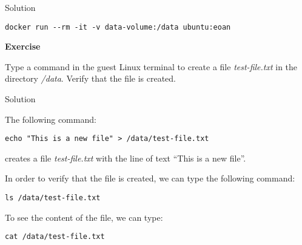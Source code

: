 \documentclass[
]{article}
\newenvironment{infobox}[1]
  {
  \begin{itemize}
  \renewcommand{\labelitemi}{
    \raisebox{-.7\height}[0pt][0pt]{
      
    }
  }
  \setlength{\fboxsep}{1em}
  \begin{whitebox}
  \item
  }
  {
  \end{whitebox}
  \end{itemize}
  }
\theoremstyle{definition}
\theoremstyle{definition}
\theoremstyle{definition}
\theoremstyle{remark}
\let\BeginKnitrBlock\begin \let\EndKnitrBlock\end
\begin{document}
Solution

\begin{infobox}{exercisebox}

\begin{verbatim}
docker run --rm -it -v data-volume:/data ubuntu:eoan 
\end{verbatim}

\end{infobox}

\begin{infobox}{exercisebox}

\textbf{Exercise}

\BeginKnitrBlock{exercise}
\protect\hypertarget{exr:unnamed-chunk-27}{}{\label{exr:unnamed-chunk-27} }Type a command in the guest Linux terminal to create a file
\emph{test-file.txt} in the directory \emph{/data}.
Verify that the file is created.
\EndKnitrBlock{exercise}

\end{infobox}

Solution

\begin{infobox}{exercisebox}

The following command:

\begin{verbatim}
echo "This is a new file" > /data/test-file.txt
\end{verbatim}

creates a file \emph{test-file.txt} with the line of text
``This is a new file''.

In order to verify that the file is created, we can
type the following command:

\begin{verbatim}
ls /data/test-file.txt
\end{verbatim}

To see the content of the file, we can type:

\begin{verbatim}
cat /data/test-file.txt
\end{verbatim}

\end{infobox}
\end{document}
